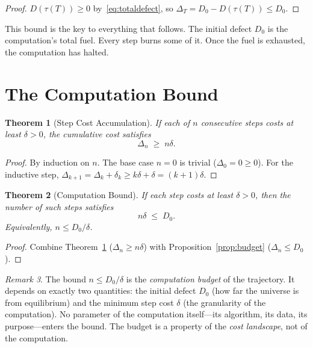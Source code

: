 \documentclass[11pt,a4paper]{article}
\theoremstyle{plain}
\newtheorem{theorem}{Theorem}[section]
\theoremstyle{definition}
\theoremstyle{remark}
\newtheorem{remark}[theorem]{Remark}
\begin{document}
\begin{proof}
$D(\tau(T)) \ge 0$ by~\eqref{eq:totaldefect}, so $\Delta_T = D_0 - D(\tau(T)) \le D_0$.
\end{proof}

This bound is the key to everything that follows.
The initial defect $D_0$ is the computation's total fuel.
Every step burns some of it.
Once the fuel is exhausted, the computation has halted.

\section{The Computation Bound}\label{sec:bound}

\begin{theorem}[Step Cost Accumulation]\label{thm:accumulation}
If each of $n$ consecutive steps costs at least $\delta > 0$, the cumulative cost satisfies
\[
\Delta_n \;\ge\; n\delta.
\]
\end{theorem}

\begin{proof}
By induction on $n$.
The base case $n=0$ is trivial ($\Delta_0 = 0 \ge 0$).
For the inductive step, $\Delta_{k+1} = \Delta_k + \delta_{k} \ge k\delta + \delta = (k{+}1)\delta$.
\end{proof}

\begin{theorem}[Computation Bound]\label{thm:bound}
If each step costs at least $\delta > 0$, then the number of such steps satisfies
\begin{equation}\label{eq:bound}
n\delta \;\le\; D_0.
\end{equation}
Equivalently, $n \le D_0/\delta$.
\end{theorem}

\begin{proof}
Combine Theorem~\ref{thm:accumulation} ($\Delta_n \ge n\delta$) with Proposition~\ref{prop:budget} ($\Delta_n \le D_0$).
\end{proof}

\begin{remark}
The bound $n \le D_0/\delta$ is the \emph{computation budget} of the trajectory.
It depends on exactly two quantities: the initial defect $D_0$ (how far the universe is from equilibrium) and the minimum step cost $\delta$ (the granularity of the computation).
No parameter of the computation itself---its algorithm, its data, its purpose---enters the bound.
The budget is a property of the \emph{cost landscape}, not of the computation.
\end{remark}
\end{document}
